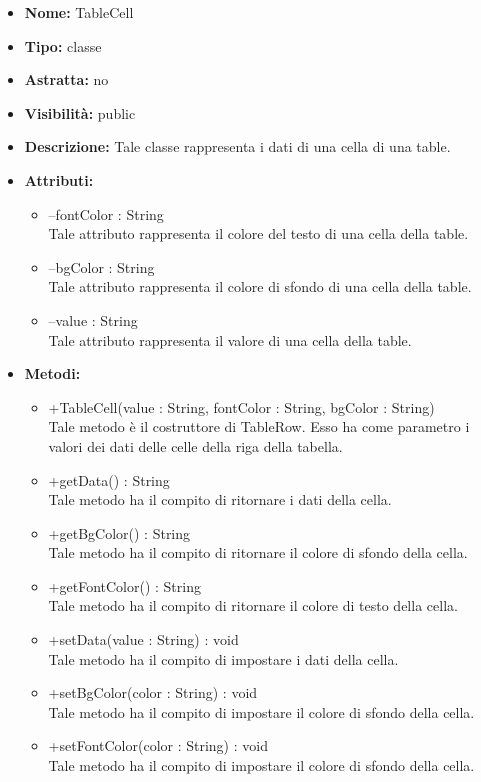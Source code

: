 			
			\begin{itemize}
			\item \textbf{Nome:} TableCell
			\item \textbf{Tipo:} classe
			
		\item \textbf{Astratta:}
		no
			\item \textbf{Visibilità:} public
			\item \textbf{Descrizione:} Tale classe rappresenta i dati di una cella di una table.
			\item \textbf{Attributi:}
				\begin{itemize}
				\setlength{\itemsep}{5pt}
				
					\item[\ding{111}] {--fontColor : String} \\ [1mm] Tale attributo rappresenta il colore del testo di una cella della table.
					\item[\ding{111}] {--bgColor : String} \\ [1mm] Tale attributo rappresenta il colore di sfondo di una cella della table.
					\item[\ding{111}] {--value : String} \\ [1mm] Tale attributo rappresenta il valore di una cella della table.
				\end{itemize}
		
			\item \textbf{Metodi:}
				\begin{itemize}
				\setlength{\itemsep}{5pt}
				
					\item[\ding{111}] {{+TableCell(value : String, fontColor : String, bgColor : String)}} \\ [1mm] Tale metodo è il costruttore di TableRow. Esso ha come parametro i valori dei dati delle celle della riga della tabella.
					\item[\ding{111}] {{+getData() : String}} \\ [1mm] Tale metodo ha il compito di ritornare i dati della cella.
					\item[\ding{111}] {{+getBgColor() : String}} \\ [1mm] Tale metodo ha il compito di ritornare il colore di sfondo della cella.
					\item[\ding{111}] {{+getFontColor() : String}} \\ [1mm] Tale metodo ha il compito di ritornare il colore di testo della cella.
					\item[\ding{111}] {{+setData(value : String) : void}} \\ [1mm] Tale metodo ha il compito di impostare i dati della cella.
					\item[\ding{111}] {{+setBgColor(color : String) : void}} \\ [1mm] Tale metodo ha il compito di impostare il colore di sfondo della cella.
					\item[\ding{111}] {{+setFontColor(color : String) : void}} \\ [1mm] Tale metodo ha il compito di impostare il colore di sfondo della cella.
				\end{itemize}
		

\end{itemize}
